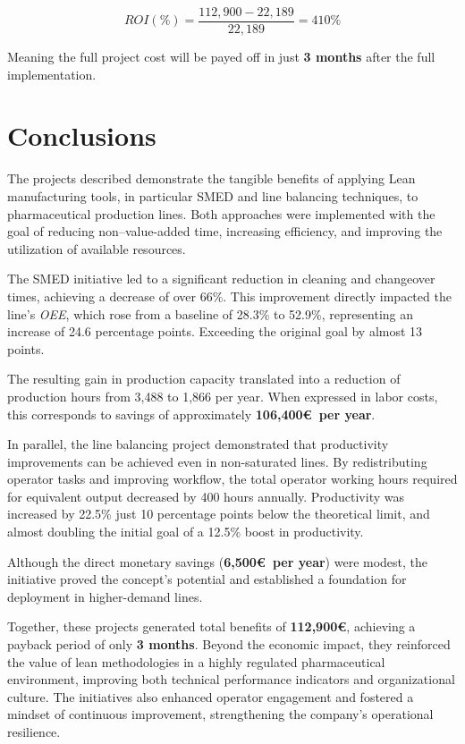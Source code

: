 \documentclass[]{article}
\begin{document}
\begin{equation}
  ROI (\%)= \frac{112,900-22,189}{22,189} = 410\%
\end{equation}

Meaning the full project cost will be payed off in just \textbf{3 months} after the full implementation.

\clearpage
\newpage
\section{Conclusions}

The projects described demonstrate the tangible benefits of applying Lean manufacturing tools, in particular \gls{SMED} and line balancing techniques, to pharmaceutical production lines. Both approaches were implemented with the goal of reducing non–value-added time, increasing efficiency, and improving the utilization of available resources.

The \gls{SMED} initiative led to a significant reduction in cleaning and changeover times, achieving a decrease of over 66\%. This improvement directly impacted the line's \textit{OEE}, which rose from a baseline of 28.3\% to 52.9\%, representing an increase of 24.6 percentage points. Exceeding the original goal by almost 13 points.

The resulting gain in production capacity translated into a reduction of production hours from 3,488 to 1,866 per year. When expressed in labor costs, this corresponds to savings of approximately \textbf{106,400\euro~per year}. 

In parallel, the line balancing project demonstrated that productivity improvements can be achieved even in non-saturated lines. By redistributing operator tasks and improving workflow, the total operator working hours required for equivalent output decreased by 400 hours annually. Productivity was increased by 22.5\% just 10 percentage points below the theoretical limit, and almost doubling the initial goal of a 12.5\% boost in productivity.

Although the direct monetary savings (\textbf{6,500\euro~per year}) were modest, the initiative proved the concept’s potential and established a foundation for deployment in higher-demand lines.

Together, these projects generated total benefits of \textbf{112,900\euro}, achieving a payback period of only \textbf{3 months}. Beyond the economic impact, they reinforced the value of lean methodologies in a highly regulated pharmaceutical environment, improving both technical performance indicators and organizational culture. The initiatives also enhanced operator engagement and fostered a mindset of continuous improvement, strengthening the company’s operational resilience.
\end{document}
